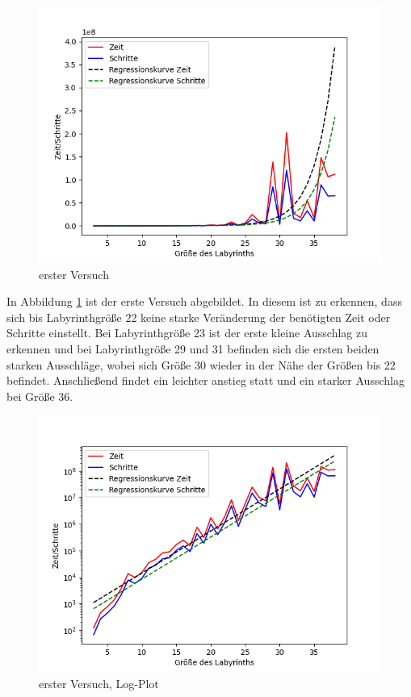 \documentclass[12pt, a4paper, titlepage]{article}
\begin{document}
\begin{figure}[h]
	\centering
	\includegraphics[scale=.5]{v1Aus.png}
	\caption{erster Versuch}
	\label{fig:Plot v1}
\end{figure}
 
In Abbildung \ref{fig:Plot v1} ist der erste Versuch abgebildet.
In diesem ist zu erkennen, dass sich bis Labyrinthgröße 22 keine starke Veränderung der benötigten Zeit oder Schritte einstellt.
Bei Labyrinthgröße 23 ist der erste kleine Ausschlag zu erkennen und bei Labyrinthgröße 29 und 31 befinden sich die ersten beiden starken Ausschläge, wobei sich Größe 30 wieder in der Nähe der Größen bis 22 befindet.
Anschließend findet ein leichter anstieg statt und ein starker Ausschlag bei Größe 36.

\begin{figure}[t]
	\centering
	\includegraphics[scale=.5]{v1AusLog.png}
	\caption{erster Versuch, Log-Plot}
	\label{fig:Plot v1Log}
\end{figure}
\end{document}
